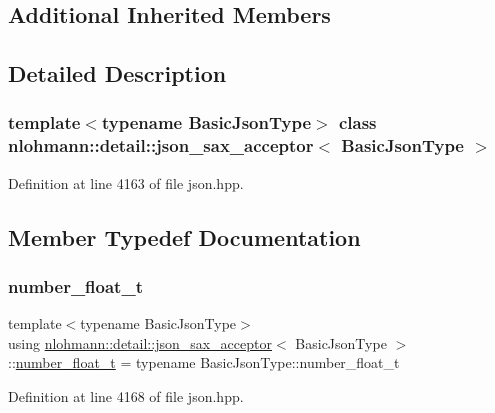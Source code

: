 \subsection*{Additional Inherited Members}


\subsection{Detailed Description}
\subsubsection*{template$<$typename Basic\+Json\+Type$>$\newline
class nlohmann\+::detail\+::json\+\_\+sax\+\_\+acceptor$<$ Basic\+Json\+Type $>$}



Definition at line 4163 of file json.\+hpp.



\subsection{Member Typedef Documentation}
\mbox{\label{classnlohmann_1_1detail_1_1json__sax__acceptor_a5502f483fc60a1bcd73e0e46b6ab36e4}} 
\subsubsection{\texorpdfstring{number\+\_\+float\+\_\+t}{number\_float\_t}}
{\footnotesize\ttfamily template$<$typename Basic\+Json\+Type$>$ \\
using \hyperlink{classnlohmann_1_1detail_1_1json__sax__acceptor}{nlohmann\+::detail\+::json\+\_\+sax\+\_\+acceptor}$<$ Basic\+Json\+Type $>$\+::\hyperlink{structnlohmann_1_1json__sax_a390c209bffd8c4800c8f3076dc465a20}{number\+\_\+float\+\_\+t} =  typename Basic\+Json\+Type\+::number\+\_\+float\+\_\+t}



Definition at line 4168 of file json.\+hpp.

\mbox{\label{classnlohmann_1_1detail_1_1json__sax__acceptor_a41876b17c0e8bdb55580eaf5e4e2ded8}} 
